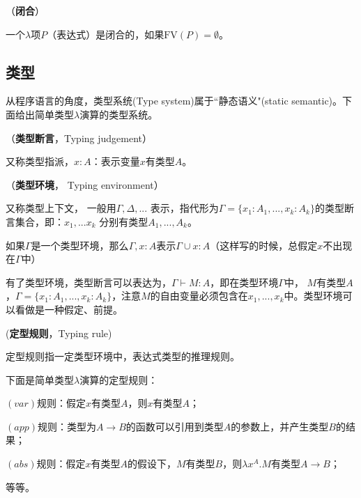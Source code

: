 \begin{defn}（\textbf{闭合}）

一个$\lambda$项$P$（表达式）是闭合的，如果$\text{FV}(P)=\emptyset$。

\end{defn}


\subsection{类型}

从程序语言的角度，类型系统(Type system)属于``静态语义"(static semantic)。下面给出简单类型$\lambda$演算的类型系统。

\begin{defn}（\textbf{类型断言}，Typing judgement）

又称类型指派，$x:A$：表示变量$x$有类型$A$。

\end{defn}

\begin{defn}（\textbf{类型环境}， Typing environment）

又称类型上下文， 一般用$\Gamma, \Delta,...$ 表示，指代形为$\Gamma = \{x_1:A_1,...,x_k:A_k \}$的类型断言集合，即：$x_1,...x_k$ 分别有类型$A_1,...,A_k$。

\end{defn}

\begin{note}

如果$\Gamma$是一个类型环境，那么$\Gamma, x:A$表示$\Gamma \cup {x:A}$（这样写的时候，总假定$x$不出现在$\Gamma$中）

\end{note}

有了类型环境，类型断言可以表达为，$\Gamma \vdash M:A$，即在类型环境$\Gamma$中， $M$有类型$A$，$\Gamma = \{x_1:A_1,...,x_k:A_k \}$，注意$M$的自由变量必须包含在$x_1, ..., x_k$中。类型环境可以看做是一种假定、前提。


\begin{defn}(\textbf{定型规则}，Typing rule)

定型规则指一定类型环境中，表达式类型的推理规则。

\end{defn}

下面是简单类型$\lambda$演算的定型规则：
\begin{tightenum}
  \item $(var)$规则：假定$x$有类型$A$，则$x$有类型$A$；
  \item $(app)$规则：类型为$A \to B$的函数可以引用到类型$A$的参数上，并产生类型$B$的结果；
  \item $(abs)$规则：假定$x$有类型$A$的假设下，$M$有类型$B$，则$\lambda x^A.M$有类型$A \to B$；
  \item 等等。
\end{tightenum}

